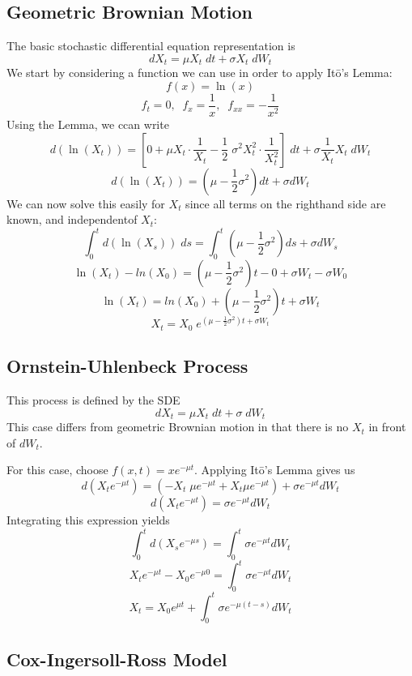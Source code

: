 \documentclass[12pt]{article}
\theoremstyle{plain}
\theoremstyle{definition}
\theoremstyle{remark}
\begin{document}
\subsection{Geometric Brownian Motion}

The basic stochastic differential equation representation is
   \[ dX_t = \mu X_t \; dt + \sigma X_t \;dW_t \]
We start by considering a function we can use in order to apply
It\={o}'s Lemma:
   \[ f(x) = \ln(x) \]
   \[ f_t = 0, \;\; f_x = \frac{1}{x}, \;\; f_{xx} = -\frac{1}{x^2} \]
Using the Lemma, we ccan write
   \[ d(\ln(X_t)) = \left[ 0 + \mu X_t \cdot \frac{1}{X_t} -
      \frac{1}{2} \; \sigma^2 X_t^2 \cdot \frac{1}{X_t^2} \right]\; dt
      + \sigma \frac{1}{X_t} X_t\; dW_t \]
   \[ d(\ln(X_t)) = \left( \mu - \frac{1}{2}\sigma^2 \right) dt
      + \sigma dW_t \]
We can now solve this easily for $X_t$ since all terms on the righthand
side are known, and independentof $X_t$:
   \[ \int^t_0 d(\ln(X_s)) \; ds =  \int^t_0 \left( \mu -
      \frac{1}{2}\sigma^2 \right) ds + \sigma dW_s \]
   \[ \ln(X_t) - ln(X_0) = \left( \mu -
      \frac{1}{2}\sigma^2 \right) t - 0 + \sigma W_t - \sigma W_0 \]
   \[ \ln(X_t) = ln(X_0) + \left( \mu -
      \frac{1}{2}\sigma^2 \right) t +  \sigma W_t \]
   \[X_t = X_0 \; e^{\left( \mu -
      \frac{1}{2}\sigma^2 \right) t +  \sigma W_t} \]

\subsection{Ornstein-Uhlenbeck Process}

This process is defined by the SDE
   \[ dX_t = \mu X_t \; dt + \sigma \;dW_t \]
This case differs from geometric Brownian motion in that there is no
$X_t$ in front of $dW_t$.

For this case, choose $f(x,t) = xe^{-\mu t}$.  Applying It\={o}'s Lemma
gives us
   \[d(X_t e^{-\mu t})=\left(-X_t\;\mu e^{-\mu t} + X_t \mu e^{-\mu t}
      \right) + \sigma e^{-\mu t} dW_t \]
   \[ d(X_t e^{-\mu t})= \sigma e^{-\mu t} dW_t \]
Integrating this expression yields
   \[ \int^t_0 d(X_s e^{-\mu s}) = \int^t_0 \sigma e^{-\mu t} dW_t \]
   \[ X_t e^{-\mu t} - X_0 e^{-\mu 0} = \int^t_0 \sigma e^{-\mu t} dW_t
      \]
   \[ X_t = X_0 e^{\mu t} + \int^t_0 \sigma e^{-\mu (t-s)} dW_t
      \]

\subsection{Cox-Ingersoll-Ross Model}
\end{document}
